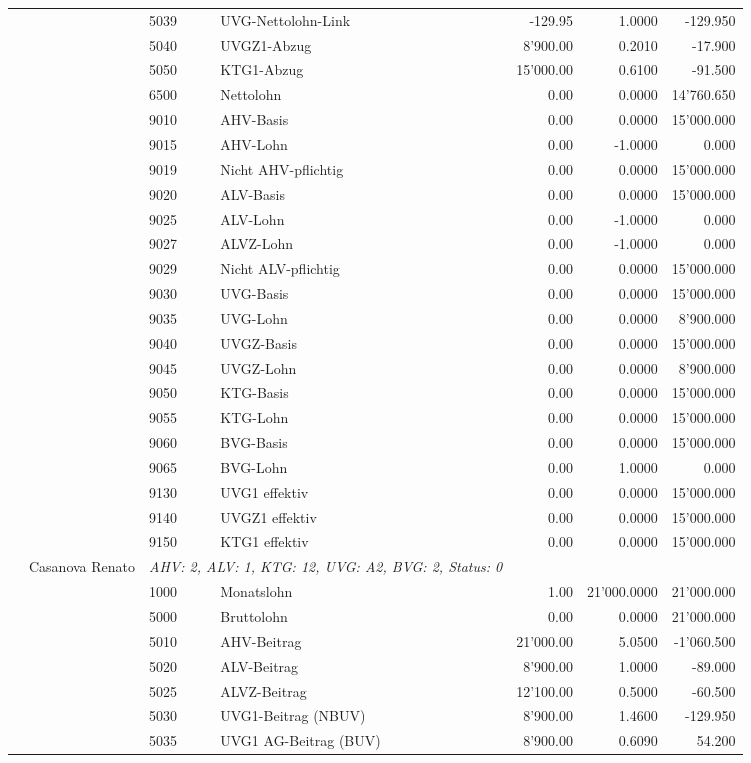 \documentclass[15pt,a4paper]{article}
\begin{document}
\begin{longtable}{@{\extracolsep{\fill}}l l l l|r|r|r}
&&5039&UVG-Nettolohn-Link&-129.95&1.0000&-129.950\\
&&5040&UVGZ1-Abzug&8'900.00&0.2010&-17.900\\
&&5050&KTG1-Abzug&15'000.00&0.6100&-91.500\\
&&6500&Nettolohn&0.00&0.0000&14'760.650\\
&&9010&AHV-Basis&0.00&0.0000&15'000.000\\
&&9015&AHV-Lohn&0.00&-1.0000&0.000\\
&&9019&Nicht AHV-pflichtig&0.00&0.0000&15'000.000\\
&&9020&ALV-Basis&0.00&0.0000&15'000.000\\
&&9025&ALV-Lohn&0.00&-1.0000&0.000\\
&&9027&ALVZ-Lohn&0.00&-1.0000&0.000\\
&&9029&Nicht ALV-pflichtig&0.00&0.0000&15'000.000\\
&&9030&UVG-Basis&0.00&0.0000&15'000.000\\
&&9035&UVG-Lohn&0.00&0.0000&8'900.000\\
&&9040&UVGZ-Basis&0.00&0.0000&15'000.000\\
&&9045&UVGZ-Lohn&0.00&0.0000&8'900.000\\
&&9050&KTG-Basis&0.00&0.0000&15'000.000\\
&&9055&KTG-Lohn&0.00&0.0000&15'000.000\\
&&9060&BVG-Basis&0.00&0.0000&15'000.000\\
&&9065&BVG-Lohn&0.00&1.0000&0.000\\
&&9130&UVG1 effektiv&0.00&0.0000&15'000.000\\
&&9140&UVGZ1 effektiv&0.00&0.0000&15'000.000\\
&&9150&KTG1 effektiv&0.00&0.0000&15'000.000\\
\pagebreak
3&Casanova Renato&\multicolumn{2}{l|}{\small\emph{AHV: 2, ALV: 1, KTG: 12, UVG: A2, BVG: 2, Status: 0}}&& \\
&&1000&Monatslohn&1.00&21'000.0000&21'000.000\\
&&5000&Bruttolohn&0.00&0.0000&21'000.000\\
&&5010&AHV-Beitrag&21'000.00&5.0500&-1'060.500\\
&&5020&ALV-Beitrag&8'900.00&1.0000&-89.000\\
&&5025&ALVZ-Beitrag&12'100.00&0.5000&-60.500\\
&&5030&UVG1-Beitrag (NBUV)&8'900.00&1.4600&-129.950\\
&&5035&UVG1 AG-Beitrag (BUV)&8'900.00&0.6090&54.200\\

\end{longtable}
\end{document}
